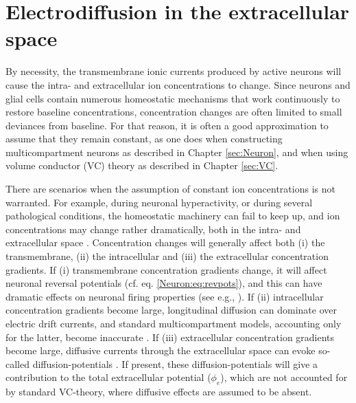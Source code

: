 \section{Electrodiffusion in the extracellular space}
\label{sec:Eldiff}
By necessity, the transmembrane ionic currents produced by active neurons will cause the intra- and extracellular ion concentrations to change. Since neurons and glial cells contain numerous homeostatic mechanisms that work continuously to restore baseline concentrations, concentration changes are often limited to small deviances from baseline. For that reason, it is often a good approximation to assume that they remain constant, as one does when constructing multicompartment neurons as described in Chapter \ref{sec:Neuron}, and when using volume conductor (VC) theory as described in Chapter \ref{sec:VC}.

There are scenarios when the assumption of constant ion concentrations is not warranted. For example, during neuronal hyperactivity, or during several pathological conditions, the homeostatic machinery can fail to keep up, and ion concentrations may change rather dramatically, both in the intra- and extracellular space \citep{kraio1978, Dietzel1989, Somjen2001, Somjenboka, Frohlich2008, Zandt2015, Ayata2015}. Concentration changes will generally affect both (i) the transmembrane, (ii) the intracellular and (iii) the extracellular concentration gradients. If (i) transmembrane concentration gradients change, it will affect neuronal reversal potentials (cf. eq. \ref{Neuron:eq:revpots}), and this can have dramatic effects on neuronal firing properties (see e.g., \citep{Cressman2009, Zandt2011, Oyehaug2012, WeiUllahSchiff2014, Saetra2020}). If (ii) intracellular concentration gradients become large, longitudinal diffusion can dominate over electric drift currents, and standard multicompartment models, accounting only for the latter, 
become inaccurate \citep{Qian1989}. If (iii) extracellular concentration gradients become large, 
diffusive currents through the extracellular space can evoke so-called diffusion-potentials \citep{Gardner-Medwin1981, Dietzel1989, Halnes2016}. If present, these diffusion-potentials will give a contribution to the total extracellular potential ($\phi_e$), which are not accounted for
by standard VC-theory, where diffusive effects are assumed to be absent. 

